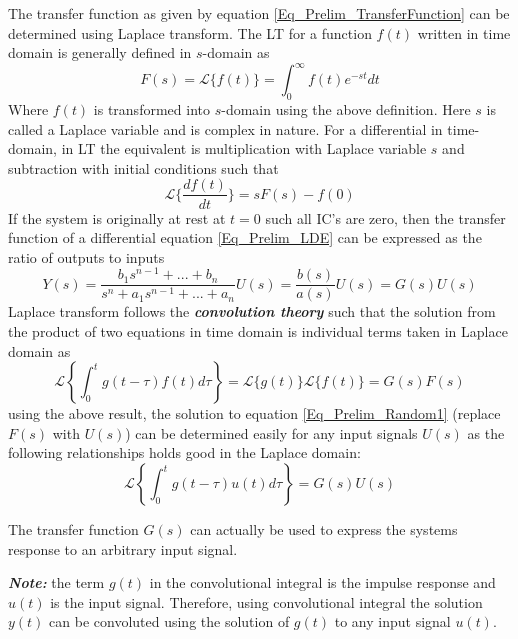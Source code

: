 The transfer function as given by equation \eqref{Eq_Prelim_TransferFunction} can be determined using Laplace transform. The LT for a function $f(t)$ written in time domain is generally defined in $s$-domain as
\begin{equation}
	F(s) = \mathcal{L}\{f(t)\} = \int_{0}^{\infty} f(t) e^{-st} dt
\end{equation}
Where $f(t)$ is transformed into $s$-domain using the above definition. Here $s$ is called a Laplace variable and is complex in nature. For a differential in time-domain, in LT the equivalent is multiplication with Laplace variable $s$ and subtraction with initial conditions such that
\begin{equation}
	\mathcal{L}\{\frac{df(t)}{dt}\} = sF(s) - f(0)
\end{equation}
If the system is originally at rest at $t = 0$ such all IC's are zero, then the transfer function of a differential equation \eqref{Eq_Prelim_LDE} can be expressed as the ratio of outputs to inputs
\begin{equation} \label{Eq_Prelim_Random1}
	Y(s) = \frac{b_{1}s^{n-1} + ... + b_n}{s^{n} + a_1 s^{n-1} + ... + a_n} U(s) = \frac{b(s)}{a(s)} U(s) = G(s) U(s)
\end{equation}
Laplace transform follows the \textbf{\textit{convolution theory}} such that the solution from the product of two equations in time domain is individual terms taken in Laplace domain as
\begin{equation}
	\mathcal{L} \left\{ \int_{0}^{t} g(t - \tau) f(t) d\tau \right\} = \mathcal{L} \{ g(t) \} \mathcal{L} \{ f(t) \} = G(s)F(s)
\end{equation}
using the above result, the solution to equation \eqref{Eq_Prelim_Random1} (replace $F(s)$ with $U(s)$) can be determined easily for any input signals $U(s)$ as the following relationships holds good in the Laplace domain:
\begin{equation} \label{Eq_Prelim_ConvolutionalIntegral}
	\mathcal{L} \left\{ \int_{0}^{t} g(t - \tau) u(t) d\tau \right\} = G(s)U(s)
\end{equation}

The transfer function $G(s)$ can actually be used to express the systems response to an arbitrary input signal.

\textbf{\textit{Note: }} the term $g(t)$ in the convolutional integral is the impulse response and $u(t)$ is the input signal. Therefore, using convolutional integral the solution $y(t)$ can be convoluted using the solution of $g(t)$ to any input signal $u(t)$.

